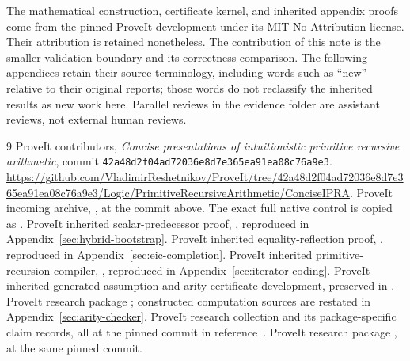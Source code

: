 \documentclass[11pt,letterpaper]{article}
\theoremstyle{definition}
\theoremstyle{remark}
\begin{document}
The mathematical construction, certificate kernel, and inherited appendix
proofs come from the pinned ProveIt development under its MIT No Attribution
license. Their attribution is retained nonetheless. The contribution of
this note is the smaller validation boundary and its correctness comparison.
The following appendices retain their source terminology, including words
such as ``new'' relative to their original reports; those words do not
reclassify the inherited results as new work here. Parallel reviews in the
evidence folder are assistant reviews, not external human reviews.

\clearpage
\appendix








\clearpage
\begin{thebibliography}{9}
 ProveIt contributors, \emph{Concise presentations of
intuitionistic primitive recursive arithmetic}, commit
\texttt{42a48d2f04ad72036e8d7e365ea91ea08c76a9e3}.
\url{https://github.com/VladimirReshetnikov/ProveIt/tree/42a48d2f04ad72036e8d7e365ea91ea08c76a9e3/Logic/PrimitiveRecursiveArithmetic/ConciseIPRA}.
 ProveIt incoming archive,
, at the commit above.
The exact full native control is copied as
.
 ProveIt inherited scalar-predecessor proof,
,
reproduced in Appendix~\ref{sec:hybrid-bootstrap}.
 ProveIt inherited equality-reflection proof,
,
reproduced in Appendix~\ref{sec:eic-completion}.
 ProveIt inherited primitive-recursion compiler,
,
reproduced in Appendix~\ref{sec:iterator-coding}.
 ProveIt inherited generated-assumption and arity
certificate development, preserved in
.
 ProveIt research package
; constructed computation sources
are restated in Appendix~\ref{sec:arity-checker}.
 ProveIt research collection and its package-specific
claim records, all at the pinned commit in reference~\cite{repo}.
 ProveIt research package ,
at the same pinned commit.
\end{thebibliography}
\end{document}
